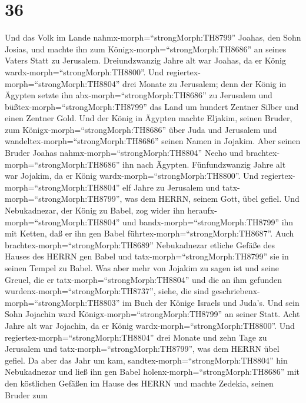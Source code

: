 \hypertarget{section-35}{%
\section{36}\label{section-35}}

 Und das Volk im Lande nahmx-morph=``strongMorph:TH8799''
Joahas, den Sohn Josias, und machte ihn zum
Königx-morph=``strongMorph:TH8686'' an seines Vaters Statt zu Jerusalem.
 Dreiundzwanzig Jahre alt war Joahas, da er König
wardx-morph=``strongMorph:TH8800''. Und
regiertex-morph=``strongMorph:TH8804'' drei Monate zu Jerusalem;
 denn der König in Ägypten setzte ihn
abx-morph=``strongMorph:TH8686'' zu Jerusalem und
büßtex-morph=``strongMorph:TH8799'' das Land um hundert Zentner Silber
und einen Zentner Gold.  Und der König in Ägypten machte
Eljakim, seinen Bruder, zum Königx-morph=``strongMorph:TH8686'' über
Juda und Jerusalem und wandeltex-morph=``strongMorph:TH8686'' seinen
Namen in Jojakim. Aber seinen Bruder Joahas
nahmx-morph=``strongMorph:TH8804'' Necho und
brachtex-morph=``strongMorph:TH8686'' ihn nach Ägypten. 
Fünfundzwanzig Jahre alt war Jojakim, da er König
wardx-morph=``strongMorph:TH8800''. Und
regiertex-morph=``strongMorph:TH8804'' elf Jahre zu Jerusalem und
tatx-morph=``strongMorph:TH8799'', was dem HERRN, seinem Gott, übel
gefiel.  Und Nebukadnezar, der König zu Babel, zog wider ihn
heraufx-morph=``strongMorph:TH8804'' und
bandx-morph=``strongMorph:TH8799'' ihn mit Ketten, daß er ihn gen Babel
führtex-morph=``strongMorph:TH8687''.  Auch
brachtex-morph=``strongMorph:TH8689'' Nebukadnezar etliche Gefäße des
Hauses des HERRN gen Babel und tatx-morph=``strongMorph:TH8799'' sie in
seinen Tempel zu Babel.  Was aber mehr von Jojakim zu sagen
ist und seine Greuel, die er tatx-morph=``strongMorph:TH8804'' und die
an ihm gefunden wurdenx-morph=``strongMorph:TH8737'', siehe, die sind
geschriebenx-morph=``strongMorph:TH8803'' im Buch der Könige Israels und
Juda's. Und sein Sohn Jojachin ward Königx-morph=``strongMorph:TH8799''
an seiner Statt.  Acht Jahre alt war Jojachin, da er König
wardx-morph=``strongMorph:TH8800''. Und
regiertex-morph=``strongMorph:TH8804'' drei Monate und zehn Tage zu
Jerusalem und tatx-morph=``strongMorph:TH8799'', was dem HERRN übel
gefiel.  Da aber das Jahr um kam,
sandtex-morph=``strongMorph:TH8804'' hin Nebukadnezar und ließ ihn gen
Babel holenx-morph=``strongMorph:TH8686'' mit den köstlichen Gefäßen im
Hause des HERRN und machte Zedekia, seinen Bruder zum
